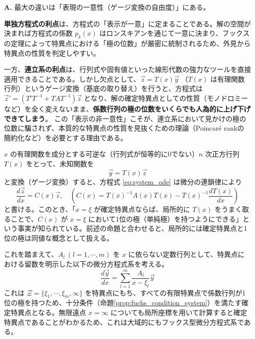 \begin{Q}
\textbf{A.} 最大の違いは「表現の一意性（ゲージ変換の自由度）」にある。

\textbf{単独方程式の利点}は、方程式の「表示が一意」に定まることである。解の空間が決まれば方程式の係数 $p_k(x)$ はロンスキアンを通じて一意に決まり、フックスの定理によって特異点における「極の位数」が厳密に統制されるため、外見から特異点の性質を判定しやすい。

一方、\textbf{連立系の利点}は、行列式や固有値といった線形代数の強力なツールを直接適用できることである。しかし欠点として、$\vec{z} = T(x)\vec{y}$ （$T(x)$ は有理関数行列）というゲージ変換（基底の取り替え）を行うと、方程式は $\vec{z}' = (T'T^{-1} + TAT^{-1})\vec{z}$ となり、解の確定特異点としての性質（モノドロミーなど）を全く変えないまま、\textbf{係数行列の極の位数をいくらでも人為的に上げ下げできてしまう}。
この「表示の非一意性」こそが、連立系において見かけの極の位数に騙されず、本質的な特異点の性質を見抜くための理論（Poincaré rankの簡約化など）を必要とする理由である。
\end{Q}
$x$ の有理関数を成分とする可逆な（行列式が恒等的に0でない）$n$ 次正方行列 $T(x)$ をとって、未知関数を
\begin{equation}\label{eq:gauge_transform_x}
    \vec{y} = T(x)\vec{z}
\end{equation}
と変換（ゲージ変換）すると、方程式 \eqref{eq:system_ode} は微分の連鎖律により
\begin{equation}
    \frac{d\vec{z}}{dx} = C(x)\vec{z}, \quad \left( C(x) = T(x)^{-1}A(x)T(x) - T(x)^{-1}\frac{dT(x)}{dx} \right)
\end{equation}
と書ける。このとき、「$x=\xi$ が確定特異点ならば、局所的に $T(x)$ をうまく取ることで、$C(x)$ が $x=\xi$ において1位の極（単純極）を持つようにできる」という事実が知られている。前述の命題と合わせると、局所的には確定特異点と1位の極は同値な概念として扱える。

これを踏まえて、$A_{l} \ (l=1,\cdots,m)$ を $x$ に依らない定数行列として、特異点における留数を明示した以下の微分方程式系を考える。
\begin{equation}\label{eq:schlesinger}
    \frac{d\vec{y}}{dx} = \sum_{l=1}^{m}\frac{A_{l}}{x-\xi_{l}}\vec{y}
\end{equation}
これは $\Xi=\{\xi_{1},\cdots,\xi_{m},\infty\}$ を特異点にもち、すべての有限特異点で係数行列が1位の極を持つため、十分条件（命題\ref{prop:fuchs_condition_system}）を満たす確定特異点となる。無限遠点 $x=\infty$ についても局所座標を用いて計算すると確定特異点であることがわかるため、これは大域的にもフックス型微分方程式系である。

